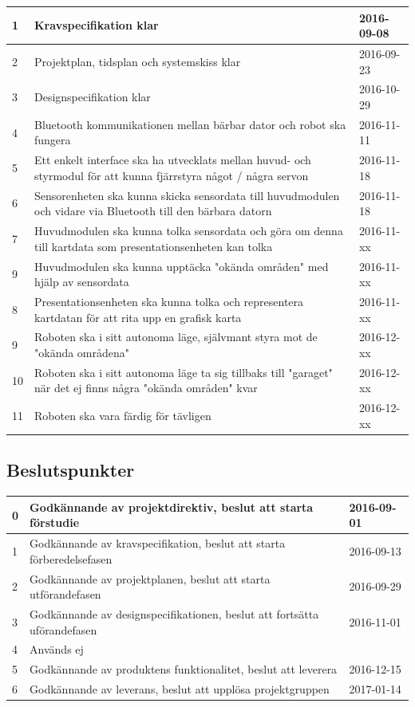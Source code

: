 \documentclass{article}
\begin{document}
\begin{center}
  \begin{tabular}{ | l | l | l | }
    \hline
    1 & Kravspecifikation klar & 2016-09-08 \\ \hline
    2 & Projektplan, tidsplan och systemskiss klar & 2016-09-23  \\ \hline
    3 & Designspecifikation klar & 2016-10-29 \\ \hline
    4 & Bluetooth kommunikationen mellan bärbar dator och robot ska fungera & 2016-11-11 \\ \hline
    5 & Ett enkelt interface ska ha utvecklats mellan huvud- och styrmodul för att kunna fjärrstyra något / några servon & 2016-11-18 \\ \hline
		6 & Sensorenheten ska kunna skicka sensordata till huvudmodulen och vidare via Bluetooth till den bärbara datorn & 2016-11-18 \\ \hline
    7 & Huvudmodulen ska kunna tolka sensordata och göra om denna till kartdata som presentationsenheten kan tolka & 2016-11-xx \\ \hline
		9 & Huvudmodulen ska kunna upptäcka "okända områden" med hjälp av sensordata & 2016-11-xx \\ \hline
		8 & Presentationsenheten ska kunna tolka och representera kartdatan för att rita upp en grafisk karta & 2016-11-xx \\ \hline
		9 & Roboten ska i sitt autonoma läge, självmant styra mot de "okända områdena" & 2016-12-xx \\ \hline
		10 & Roboten ska i sitt autonoma läge ta sig tillbaks till "garaget" när det ej finns några "okända områden" kvar & 2016-12-xx \\ \hline
		11 & Roboten ska vara färdig för tävligen & 2016-12-xx \\
    \hline
  \end{tabular}
\end{center}
\subsection{Beslutspunkter}
\begin{center}
  \begin{tabular}{ | l | l | l | }
    \hline
    0 & Godkännande av projektdirektiv, beslut att starta förstudie & 2016-09-01 \\ \hline
    1 & Godkännande av kravspecifikation, beslut att starta förberedelsefasen & 2016-09-13 \\ \hline
    2 & Godkännande av projektplanen, beslut att starta utförandefasen & 2016-09-29 \\ \hline
    3 & Godkännande av designspecifikationen, beslut att fortsätta uförandefasen & 2016-11-01 \\ \hline
    4 & Används ej &  \\ \hline
    5 & Godkännande av produktens funktionalitet, beslut att leverera & 2016-12-15 \\ \hline
    6 & Godkännande av leverans, beslut att upplösa projektgruppen & 2017-01-14 \\
    \hline
  \end{tabular}
\end{center}
\end{document}
